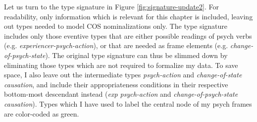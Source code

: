 Let us turn to the type signature in Figure \ref{fig:signature-update2}. For readability, only information which is relevant for this chapter is included, leaving out types needed to model COS nominalizations only.
The type signature includes only those eventive types that are either possible readings of psych verbs (e.g. \textit{experiencer-psych-action}), or that are needed as frame elements (e.g. \textit{change-of-psych-state}). 
The original type signature can thus be slimmed down by eliminating those types which are not required to formalize my data. To save space, I also leave out the intermediate types \textit{psych-action} and \textit{change-of-state causation}, and include their appropriateness conditions in their respective bottom-most descendant instead (\textit{exp psych-action} and \textit{change-of-psych-state causation}). Types which I have used to label the central node of my psych frames are color-coded as green.

